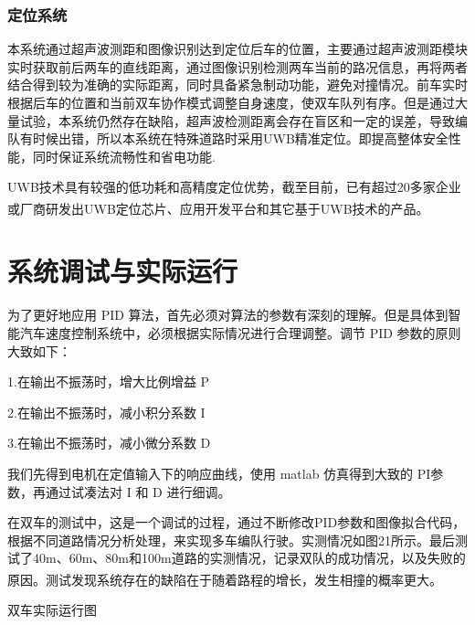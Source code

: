 \documentclass{article}%
\begin{document}
\begin{multicols}{2}
		\subsubsection{定位系统}
		本系统通过超声波测距和图像识别达到定位后车的位置，主要通过超声波测距模块实时获取前后两车的直线距离，通过图像识别检测两车当前的路况信息，再将两者结合得到较为准确的实际距离，同时具备紧急制动功能，避免对撞情况。前车实时根据后车的位置和当前双车协作模式调整自身速度，使双车队列有序。但是通过大量试验，本系统仍然存在缺陷，超声波检测距离会存在盲区和一定的误差，导致编队有时候出错，所以本系统在特殊道路时采用UWB精准定位。即提高整体安全性能，同时保证系统流畅性和省电功能.
		
		UWB技术具有较强的低功耗和高精度定位优势，截至目前，已有超过20多家企业或厂商研发出UWB定位芯片、应用开发平台和其它基于UWB技术的产品\textsuperscript{\cite{ref9}}。
		
		\section{系统调试与实际运行}
		
		为了更好地应用 PID 算法，首先必须对算法的参数有深刻的理解。但是具体到智能汽车速度控制系统中，必须根据实际情况进行合理调整。调节 PID 参数的原则大致如下：
				
		1.在输出不振荡时，增大比例增益 P
		
		2.在输出不振荡时，减小积分系数 I
	
		3.在输出不振荡时，减小微分系数 D
		
		我们先得到电机在定值输入下的响应曲线，使用 matlab 仿真得到大致的 PI参数，再通过试凑法对 I 和 D 进行细调。 
		
		在双车的测试中，这是一个调试的过程，通过不断修改PID参数和图像拟合代码，根据不同道路情况分析处理，来实现多车编队行驶。实测情况如图21所示。最后测试了40m、60m、80m和100m道路的实测情况，记录双队的成功情况，以及失败的原因。测试发现系统存在的缺陷在于随着路程的增长，发生相撞的概率更大\textsuperscript{\cite{ref10}}。
		
		\begin{center}
			\caption{双车实际运行图}		
		\end{center}


\end{multicols}
\end{document}
